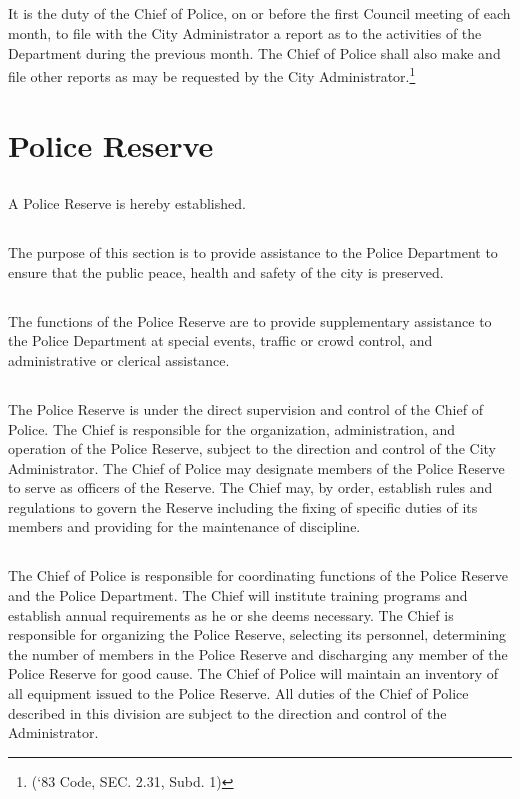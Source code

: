 \subsection{}
It is the duty of the Chief of Police, on or before the first Council meeting of each month, to file with the City Administrator a report as to the activities of the Department during the previous month. The Chief of Police shall also make and file other reports as may be requested by the City Administrator.\footnote{(‘83 Code, SEC. 2.31, Subd. 1)}

\section{Police Reserve}
\subsection{}
A Police Reserve is hereby established.
\subsection{}
The purpose of this section is to provide assistance to the Police Department to ensure that the public peace, health and safety of the city is preserved.
\subsection{}
The functions of the Police Reserve are to provide supplementary assistance to the Police Department at special events, traffic or crowd control, and administrative or clerical assistance.
\subsection{}
The Police Reserve is under the direct supervision and control of the Chief of Police.  The Chief is responsible for the organization, administration, and operation of the Police Reserve, subject to the direction and control of the City Administrator. The Chief of Police may designate members of the Police Reserve to serve as officers of the Reserve. The Chief may, by order, establish rules and regulations to govern the Reserve including the fixing of specific duties of its members and providing for the maintenance of discipline.
\subsection{}
The Chief of Police is responsible for coordinating functions of the Police Reserve and the Police Department. The Chief will institute training programs and establish annual requirements as he or she deems necessary. The Chief is responsible for organizing the Police Reserve, selecting its personnel, determining the number of members in the Police Reserve and discharging any member of the Police Reserve for good cause. The Chief of Police will maintain an inventory of all equipment issued to the Police Reserve. All duties of the Chief of Police described in this division are subject to the direction and control of the Administrator.
